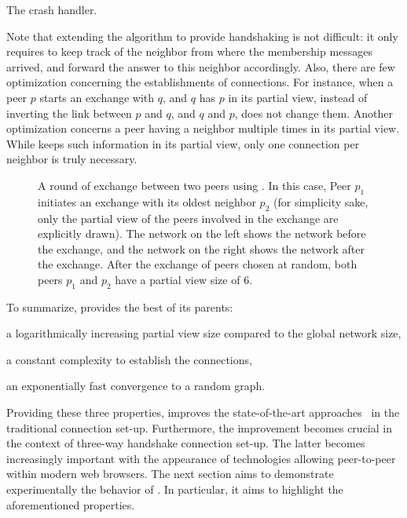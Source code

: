 \begin{algorithm}
  
  \caption{\label{algo:unreachable}The crash handler.}
\end{algorithm}

Note that extending the algorithm to provide handshaking is not difficult: it
only requires to keep track of the neighbor from where the membership messages
arrived, and forward the answer to this neighbor accordingly. Also, there are
few optimization concerning the establishments of connections. For instance,
when a peer $p$ starts an exchange with $q$, and $q$ has $p$ in its partial
view, instead of inverting the link between $p$ and $q$, and $q$ and $p$,
\SCAMPLON{} does not change them. Another optimization concerns a peer having a
neighbor multiple times in its partial view. While \SCAMPLON{} keeps such
information in its partial view, only one connection per neighbor is truly
necessary.

\begin{figure*}
  \centering
  
  \caption{\label{fig:scamplonexample} A round of exchange between two peers
    using \SCAMPLON{}. In this case, Peer $p_1$ initiates an exchange with its
    oldest neighbor $p_2$ (for simplicity sake, only the partial view of the
    peers involved in the exchange are explicitly drawn). The network on the
    left shows the network before the exchange, and the network on the right
    shows the network after the exchange. After the exchange of peers chosen at
    random, both peers $p_1$ and $p_2$ have a partial view size of $6$.}
\end{figure*}

To summarize, \SCAMPLON{} provides the best of its parents:
\begin{inparaenum}[(i)]
\item a logarithmically increasing partial view size compared to the global
  network size,
\item a constant complexity to establish the connections,
\item an exponentially fast convergence to a random graph.
\end{inparaenum}
Providing these three properties, \SCAMPLON{} improves the state-of-the-art
approaches~\cite{ganesh2001scamp,voulgaris2005cyclon} in the traditional
connection set-up. Furthermore, the improvement becomes crucial in the context
of three-way handshake connection set-up.  The latter becomes increasingly
important with the appearance of technologies allowing peer-to-peer within
modern web browsers.  The next section aims to demonstrate experimentally the
behavior of \SCAMPLON{}. In particular, it aims to highlight the aforementioned
properties.


